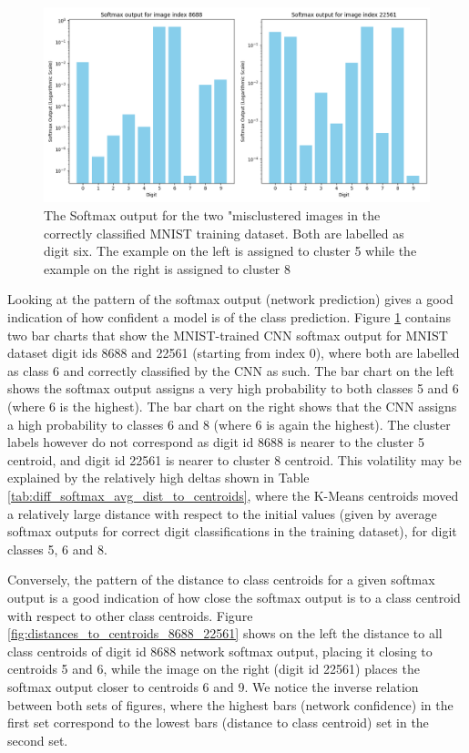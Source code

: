 \begin{figure}[H]
    \centering
    \includegraphics[width=0.99\columnwidth]{Figures/8688_22561_Softmax_Output.png}
    \caption{The Softmax output for the two "misclustered images in the correctly classified MNIST training dataset. Both are labelled as digit six. The example on the left is assigned to cluster 5 while the example on the right is assigned to cluster 8}
    \label{fig:8688_22561_Softmax_Output}
\end{figure}

Looking at the pattern of the softmax output (network prediction) gives a good indication of how confident a model is of the class prediction. Figure \ref{fig:8688_22561_Softmax_Output} contains two bar charts that show the MNIST-trained CNN softmax output for MNIST dataset digit ids 8688 and 22561 (starting from index 0), where both are labelled as class 6 and correctly classified by the CNN as such. The bar chart on the left shows the softmax output assigns a very high probability to both classes 5 and 6 (where 6 is the highest). The bar chart on the right shows that the CNN assigns a high probability to classes 6 and 8 (where 6 is again the highest). The cluster labels however do not correspond as digit id 8688 is nearer to the cluster 5 centroid, and digit id 22561 is nearer to cluster 8 centroid. This volatility may be explained by the relatively high deltas shown in Table \ref{tab:diff_softmax_avg_dist_to_centroids}, where the K-Means centroids moved a relatively large distance with respect to the initial values (given by average softmax outputs for correct digit classifications in the training dataset), for digit classes 5, 6 and 8. 

Conversely, the pattern of the distance to class centroids for a given softmax output is a good indication of how close the softmax output is to a class centroid with respect to other class centroids. Figure \ref{fig:distances_to_centroids_8688_22561} shows on the left the distance to all class centroids of digit id 8688 network softmax output, placing it closing to centroids 5 and 6, while the image on the right (digit id 22561) places the softmax output closer to centroids 6 and 9. We notice the inverse relation between both sets of figures, where the highest bars (network confidence) in the first set correspond to the lowest bars (distance to class centroid) set in the second set.



